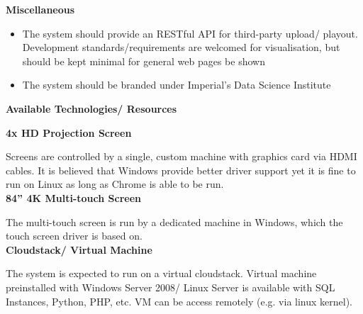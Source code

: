 ﻿\documentclass[a4paper, titlepage]{article}
\begin{document}
\textbf{\large Miscellaneous}

\begin{itemize}
\item The system should provide an RESTful API for third-party upload/ playout.
Development standards/requirements are welcomed for visualisation, but should be kept minimal for general web pages be shown
\item The system should be branded under Imperial’s Data Science Institute\\
\end{itemize}


\textbf{\Large Available Technologies/ Resources} \vspace{5pt}

\textbf{\large 4x HD Projection Screen}

Screens are controlled by a single, custom machine with graphics card via HDMI cables. It is believed that Windows provide better driver support yet it is fine to run on Linux as long as Chrome is able to be run.\\

\textbf{\large 84” 4K Multi-touch Screen}

The multi-touch screen is run by a dedicated machine in Windows, which the touch screen driver is based on.\\

\textbf{\large Cloudstack/ Virtual Machine}

The system is expected to run on a virtual cloudstack. Virtual machine preinstalled with Windows Server 2008/ Linux Server is available with SQL Instances, Python, PHP, etc. VM can be access remotely (e.g. via linux kernel).\\
\end{document}
